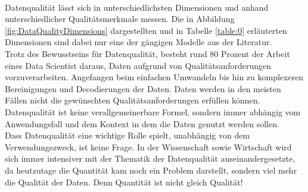 \begin{onehalfspace}
\begin{table}[h]
            \caption{Data Quality Dimensions Merkmale}
            \label{table:0}
        \end{table}
        \\
        Datenqualität lässt sich in unterschiedlichsten Dimensionen und anhand unterschiedlicher Qualitätsmerkmale messen. Die in Abbildung \ref*{fig:DataQualityDimensions} dargestellten und in Tabelle \ref*{table:0} erläuterten Dimensionen sind dabei nur eine der gängigen Modelle aus der Literatur. 
        \\
        Trotz des Bewusstseins für Datenqualität, besteht rund 80 Prozent der Arbeit eines Data Scientist daraus, Daten aufgrund von Qualitätsanforderungen vorzuverarbeiten.\cite{Horn2022} Angefangen beim einfachen Umwandeln bis hin zu komplexeren Bereinigungen und Decodierungen der Daten. Daten werden in den meisten Fällen nicht die gewünschten Qualitätsanforderungen erfüllen können. Datenqualität ist keine verallgemeinerbare Formel, sondern immer abhängig vom Anwendungsfall und dem Kontext in dem die Daten genutzt werden sollen.
        \\
        Dass Datenqualität eine wichtige Rolle spielt, unabhängig von dem Verwendungszweck, ist keine Frage. In der Wissenschaft sowie Wirtschaft wird sich immer intensiver mit der Thematik der Datenqualität auseinandergesetzte, da heutzutage die Quantität kam noch ein Problem darstellt, sondern viel mehr die Qualität der Daten.\cite{Lis2019} Denn Quantität ist nicht gleich Qualität!



\end{onehalfspace}
